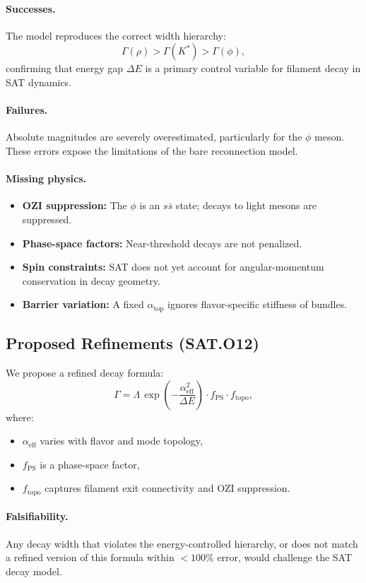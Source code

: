 \paragraph{Successes.}
The model reproduces the correct width hierarchy:
\[
\Gamma(\rho) > \Gamma(K^*) > \Gamma(\phi),
\]
confirming that energy gap $\Delta E$ is a primary control variable
for filament decay in SAT dynamics.

\paragraph{Failures.}
Absolute magnitudes are severely overestimated, particularly for the $\phi$
meson. These errors expose the limitations of the bare reconnection model.

\paragraph{Missing physics.}
\begin{itemize}
  \item \textbf{OZI suppression:} The $\phi$ is an $s\bar{s}$ state; decays to light mesons are suppressed.
  \item \textbf{Phase-space factors:} Near-threshold decays are not penalized.
  \item \textbf{Spin constraints:} SAT does not yet account for angular-momentum conservation in decay geometry.
  \item \textbf{Barrier variation:} A fixed $\alpha_{\text{top}}$ ignores flavor-specific stiffness of bundles.
\end{itemize}

\subsection{Proposed Refinements (SAT.O12)}

We propose a refined decay formula:
\[
\Gamma = \Lambda \, \exp\left(-\frac{\alpha_{\text{eff}}^2}{\Delta E} \right)
\cdot f_{\text{PS}} \cdot f_{\text{topo}},
\]
where:
\begin{itemize}
  \item $\alpha_{\text{eff}}$ varies with flavor and mode topology,
  \item $f_{\text{PS}}$ is a phase-space factor,
  \item $f_{\text{topo}}$ captures filament exit connectivity and OZI suppression.
\end{itemize}

\paragraph{Falsifiability.}
Any decay width that violates the energy-controlled hierarchy, or does not match a refined version of this formula within $<100\%$ error, would challenge the SAT decay model.

